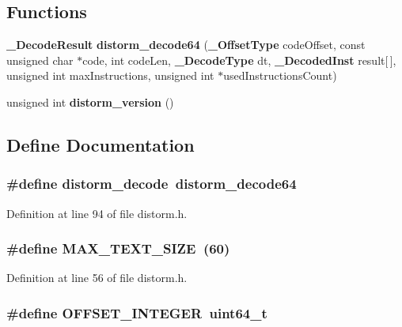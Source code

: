 \subsection*{Functions}
\begin{CompactItemize}
\item 
{\bf \_\-DecodeResult} {\bf distorm\_\-decode64} ({\bf \_\-OffsetType} codeOffset, const unsigned char $\ast$code, int codeLen, {\bf \_\-DecodeType} dt, {\bf \_\-DecodedInst} result[$\,$], unsigned int maxInstructions, unsigned int $\ast$usedInstructionsCount)
\item 
unsigned int {\bf distorm\_\-version} ()
\end{CompactItemize}


\subsection{Define Documentation}
\subsubsection[{distorm\_\-decode}]{\setlength{\rightskip}{0pt plus 5cm}\#define distorm\_\-decode~distorm\_\-decode64}\label{distorm_8h_3fe135bd26151eeaed3f69f4fae0c884}




Definition at line 94 of file distorm.h.
\subsubsection[{MAX\_\-TEXT\_\-SIZE}]{\setlength{\rightskip}{0pt plus 5cm}\#define MAX\_\-TEXT\_\-SIZE~(60)}\label{distorm_8h_18729f2eeae081f632853442b7d99f86}




Definition at line 56 of file distorm.h.
\subsubsection[{OFFSET\_\-INTEGER}]{\setlength{\rightskip}{0pt plus 5cm}\#define OFFSET\_\-INTEGER~uint64\_\-t}\label{distorm_8h_a88792793a9409e8feb291c7a0e6018d}




